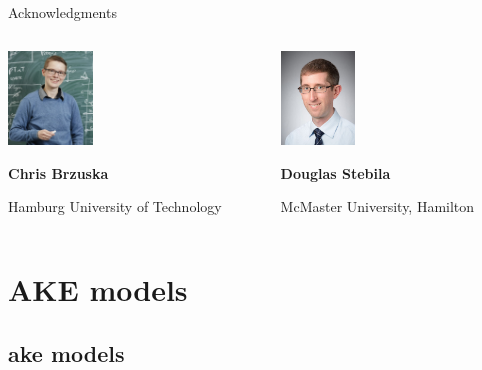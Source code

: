 \documentclass[xcolor={dvipsnames},screen,compress]{beamer}
\begin{document}
\begin{frame}{Acknowledgments}
	\begin{columns}[t]
		\begin{column}{0.49\textwidth}
			\centering
			\includegraphics[height=2.5cm,keepaspectratio]{chris}
			
			\medskip
			\scriptsize
			\textbf{Chris Brzuska}
			
			Hamburg University of Technology

		\end{column}
		\begin{column}{0.49\textwidth}
			\centering
			\includegraphics[height=2.5cm,keepaspectratio]{douglas}
			
			\medskip
			\scriptsize
			\textbf{Douglas Stebila}
			
			McMaster University, Hamilton

		\end{column}
	\end{columns}
\end{frame}





\section{AKE models}
\subsection{ake models}
\end{document}
